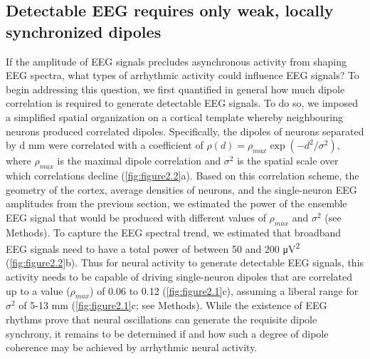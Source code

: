 \subsection{Detectable EEG requires only weak, locally synchronized dipoles}
If the amplitude of EEG signals precludes asynchronous activity from shaping EEG spectra, what types of arrhythmic activity could influence EEG signals? To begin addressing this question, we first quantified in general how much dipole correlation is required to generate detectable EEG signals. To do so, we imposed a simplified spatial organization on a cortical template whereby neighbouring neurons produced correlated dipoles. Specifically, the dipoles of neurons separated by d \unit{\milli\meter} were correlated with a coefficient of $\rho(d)=\rho_{max}\exp{(-d^2/\sigma^2)}$, where $\rho_{max}$ is the maximal dipole correlation and $\sigma^2$ is the spatial scale over which correlations decline (\autoref{fig:figure2.2}a). Based on this correlation scheme, the geometry of the cortex, average densities of neurons, and the single-neuron EEG amplitudes from the previous section, we estimated the power of the ensemble EEG signal that would be produced with different values of $\rho_{max}$ and $\sigma^2$ (see Methods). To capture the EEG spectral trend, we estimated that broadband EEG signals need to have a total power of between 50 and 200 \unit{\micro\volt\squared} (\autoref{fig:figure2.2}b). Thus for neural activity to generate detectable EEG signals, this activity needs to be capable of driving single-neuron dipoles that are correlated up to a value ($\rho_{max}$) of 0.06 to 0.12 (\autoref{fig:figure2.1}c), assuming a liberal range for $\sigma^2$ of 5-13 \unit{\milli\meter} (\autoref{fig:figure2.1}c; see Methods). While the existence of EEG rhythms prove that neural oscillations can generate the requisite dipole synchrony, it remains to be determined if and how such a degree of dipole coherence may be achieved by arrhythmic neural activity. 

